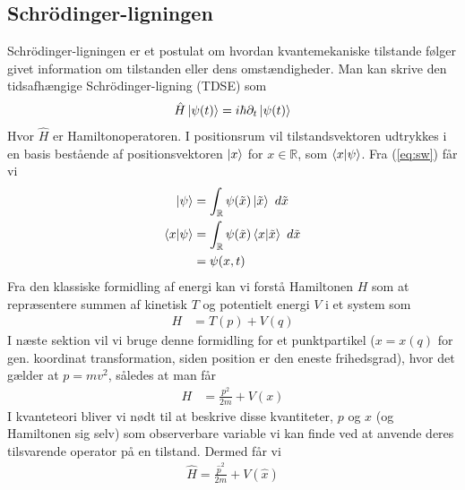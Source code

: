 \documentclass[12pt]{article}
\theoremstyle{definition}
\theoremstyle{remark}
\theoremstyle{definition}
\numberwithin{equation}{section}
\begin{document}
\subsection{Schrödinger-ligningen}
Schrödinger-ligningen er et postulat om hvordan kvantemekaniske tilstande følger givet information om tilstanden eller dens omstændigheder. Man kan skrive den tidsafhængige Schrödinger-ligning (TDSE) som
\begin{align}
  \label{eq:schr}
  \hat H \ket{\psi(t)} = i\hbar \partial_t \ket{\psi(t)}
\end{align}
Hvor $\hat H$ er Hamiltonoperatoren. 
I positionsrum vil tilstandsvektoren udtrykkes i en basis bestående af positionsvektoren ${\ket x}$ for $x\in \mathbb R$, som $\braket{x}{\psi}$. Fra (\ref{eq:sw}) får vi 
\begin{align*}
    \ket{\psi} &= \int_{\mathbb R} \psi(\tilde x)\ket{\tilde x}~d\tilde x \\
    \braket{x}{\psi} &= \int_{\mathbb R} \psi(\tilde x)\braket{x}{\tilde x}~d\tilde x \\
    &= \psi(x,t)
\end{align*}
Fra den klassiske formidling af energi kan vi forstå Hamiltonen $H$ som at repræsentere summen af kinetisk $T$ og potentielt energi $V$ i et system som
\begin{align}
    H &= T(p)+V(q)
\end{align}
I næste sektion vil vi bruge denne formidling for et punktpartikel ($x=x(q)$ for gen. koordinat transformation, siden position er den eneste frihedsgrad), hvor det gælder at $p=mv^2$, således at man får
\begin{align}
    H &= \frac{p^2}{2m} + V(x)
\end{align}
I kvanteteori bliver vi nødt til at beskrive disse kvantiteter, $p$ og $x$ (og Hamiltonen sig selv) som observerbare variable vi kan finde ved at anvende deres tilsvarende operator på en tilstand. Dermed får vi
\begin{align}
    \hat H = \frac{\hat p^2}{2m}+V(\hat x)
\end{align}

\newpage
\end{document}
